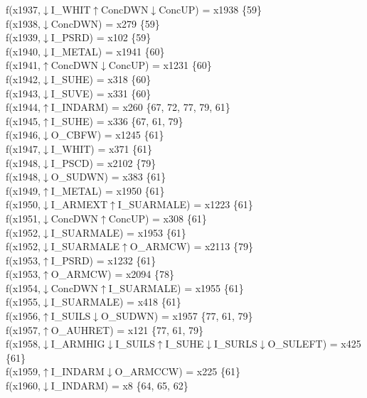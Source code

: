 f(x1937,$\downarrow$I\_WHIT$\uparrow$ConcDWN$\downarrow$ConcUP) = x1938 \{59\} \\  
f(x1938,$\downarrow$ConcDWN) = x279 \{59\} \\  
f(x1939,$\downarrow$I\_PSRD) = x102 \{59\} \\  
f(x1940,$\downarrow$I\_METAL) = x1941 \{60\} \\  
f(x1941,$\uparrow$ConcDWN$\downarrow$ConcUP) = x1231 \{60\} \\  
f(x1942,$\downarrow$I\_SUHE) = x318 \{60\} \\  
f(x1943,$\downarrow$I\_SUVE) = x331 \{60\} \\  
f(x1944,$\uparrow$I\_INDARM) = x260 \{67, 72, 77, 79, 61\} \\  
f(x1945,$\uparrow$I\_SUHE) = x336 \{67, 61, 79\} \\  
f(x1946,$\downarrow$O\_CBFW) = x1245 \{61\} \\  
f(x1947,$\downarrow$I\_WHIT) = x371 \{61\} \\  
f(x1948,$\downarrow$I\_PSCD) = x2102 \{79\} \\  
f(x1948,$\downarrow$O\_SUDWN) = x383 \{61\} \\  
f(x1949,$\uparrow$I\_METAL) = x1950 \{61\} \\  
f(x1950,$\downarrow$I\_ARMEXT$\uparrow$I\_SUARMALE) = x1223 \{61\} \\  
f(x1951,$\downarrow$ConcDWN$\uparrow$ConcUP) = x308 \{61\} \\  
f(x1952,$\downarrow$I\_SUARMALE) = x1953 \{61\} \\  
f(x1952,$\downarrow$I\_SUARMALE$\uparrow$O\_ARMCW) = x2113 \{79\} \\  
f(x1953,$\uparrow$I\_PSRD) = x1232 \{61\} \\  
f(x1953,$\uparrow$O\_ARMCW) = x2094 \{78\} \\  
f(x1954,$\downarrow$ConcDWN$\uparrow$I\_SUARMALE) = x1955 \{61\} \\  
f(x1955,$\downarrow$I\_SUARMALE) = x418 \{61\} \\  
f(x1956,$\uparrow$I\_SUILS$\downarrow$O\_SUDWN) = x1957 \{77, 61, 79\} \\  
f(x1957,$\uparrow$O\_AUHRET) = x121 \{77, 61, 79\} \\  
f(x1958,$\downarrow$I\_ARMHIG$\downarrow$I\_SUILS$\uparrow$I\_SUHE$\downarrow$I\_SURLS$\downarrow$O\_SULEFT) = x425 \{61\} \\  
f(x1959,$\uparrow$I\_INDARM$\downarrow$O\_ARMCCW) = x225 \{61\} \\  
f(x1960,$\downarrow$I\_INDARM) = x8 \{64, 65, 62\} \\  
